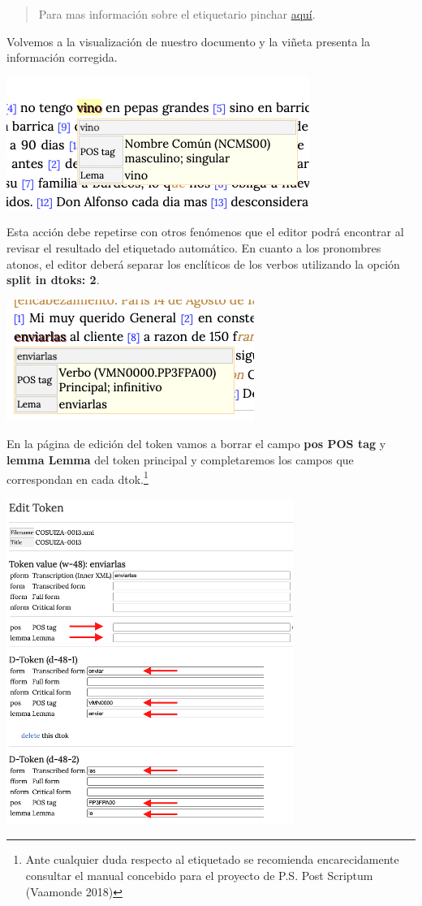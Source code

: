 \documentclass[
]{book}
\begin{document}
\begin{quote}
Para mas información sobre el etiquetario pinchar \href{https://cosuiza.unil.ch/teitok/shared/index.php?action=tagset}{aquí}.
\end{quote}

Volvemos a la visualización de nuestro documento y la viñeta presenta la información corregida.

\includegraphics{img/posmod2.png}

Esta acción debe repetirse con otros fenómenos que el editor podrá encontrar al revisar el resultado del etiquetado automático. En cuanto a los pronombres atonos, el editor deberá separar los enclíticos de los verbos utilizando la opción \textbf{split in dtoks: 2}.

\includegraphics{img/enclitico.png}

En la página de edición del token vamos a borrar el campo \textbf{pos POS tag} y \textbf{lemma Lemma} del token principal y completaremos los campos que correspondan en cada dtok.\footnote{Ante cualquier duda respecto al etiquetado se recomienda encarecidamente consultar el manual concebido para el proyecto de P.S. Post Scriptum (Vaamonde 2018)}

\includegraphics[width=0.7\textwidth,height=\textheight]{img/pronombre.png}
\end{document}
